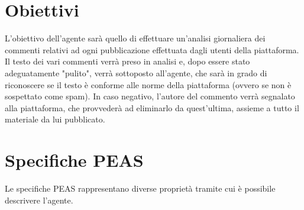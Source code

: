 \documentclass{report}
\begin{document}
    \section{Obiettivi}
    L'obiettivo dell'agente sarà quello di effettuare un'analisi giornaliera dei commenti relativi ad ogni pubblicazione effettuata dagli utenti della piattaforma.
    Il testo dei vari commenti verrà preso in analisi e, dopo essere stato adeguatamente "pulito", verrà sottoposto all'agente, che sarà in grado di riconoscere se il 
    testo è conforme alle norme della piattaforma (ovvero se non è sospettato come spam). \newline
    In caso negativo, l'autore del commento verrà segnalato alla piattaforma, che provvederà ad eliminarlo da quest'ultima, assieme a tutto il materiale da lui pubblicato.

    \section{Specifiche PEAS}
    Le specifiche PEAS rappresentano diverse proprietà tramite cui è possibile descrivere l'agente. \newline
\end{document}
